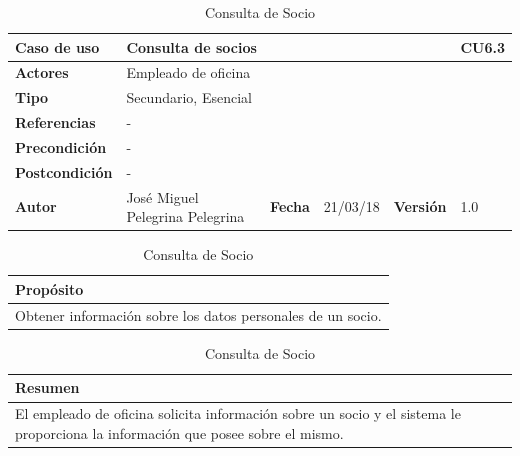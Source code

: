 \documentclass[12pt,spanish]{article}
\begin{document}
\begin{table}[H]
\centering
\begin{tabular}{|m{3cm}|m{4cm}|m{2cm}|m{2cm}|m{2cm}|m{1cm}|}
\hline
\textbf{Caso de uso} &  \multicolumn{4}{m{8cm}|}{Consulta de socios} \vline &  \cellcolor{gray!40}CU6.3 \\
\hline
\textbf{Actores} & \multicolumn{5}{m{8cm}|}{Empleado de oficina} \\
\hline
\textbf{Tipo} & \multicolumn{5}{m{8cm}|}{Secundario, Esencial} \\
\hline
\textbf{Referencias} &\multicolumn{5}{m{8cm}|}{-} \\
\hline
\textbf{Precondición} & \multicolumn{5}{m{8cm}|}{-} \\
\hline
\textbf{Postcondición} & \multicolumn{5}{m{8cm}|}{-} \\
\hline
\textbf{Autor} & José Miguel Pelegrina Pelegrina & \textbf{Fecha} & 21/03/18 & \textbf{Versión} & 1.0 \\
\hline
\end{tabular}

\vspace{1cm}

\begin{tabular}{|m{16.2cm}|}
\hline
\textbf{Propósito} \\
\hline
Obtener información sobre los datos personales de un socio. \\
\hline
\end{tabular}

\vspace{1cm}

\begin{tabular}{|m{16.2cm}|}
\hline
\textbf{Resumen} \\
\hline
El empleado de oficina solicita información sobre un socio y el sistema le proporciona la información que posee sobre el mismo. \\
\hline
\end{tabular}

\caption{Consulta de Socio}
\end{table}
\end{document}
